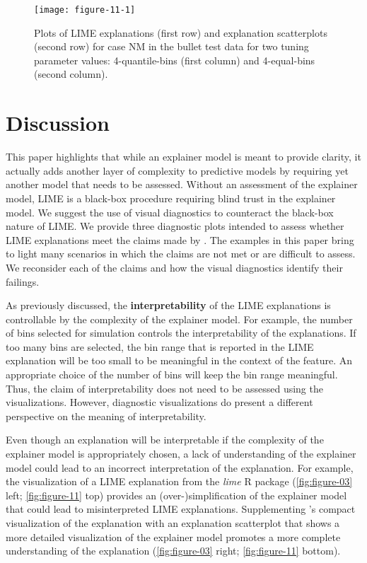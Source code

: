 \documentclass[AMS,STIX2COL]{WileyNJD-v2}\usepackage[]{graphicx}\usepackage[]{color}
\newenvironment{knitrout}{}{} %
\begin{document}
\begin{figure}[!thp]
\begin{knitrout}
\color{fgcolor}

{\centering \texttt{[image: figure-11-1]} 

}



\end{knitrout}
\caption{Plots of LIME explanations (first row) and explanation scatterplots (second row) for case NM in the bullet test data for two tuning parameter values: 4-quantile-bins (first column) and 4-equal-bins (second column).}
\label{fig:figure-11}
\end{figure}

\section{Discussion} \label{discussion}

This paper highlights that while an explainer model is meant to provide clarity, it actually adds another layer of complexity to predictive models by requiring yet another model that needs to be assessed. Without an assessment of the explainer model, LIME is a black-box procedure requiring blind trust in the explainer model. We suggest the use of visual diagnostics to counteract the black-box nature of LIME. We provide three diagnostic plots intended to assess whether LIME explanations meet the claims made by \citet{ribeiro:2016}. The examples in this paper bring to light many scenarios in which the claims are not met or are difficult to assess. We reconsider each of the claims and how the visual diagnostics identify their failings.

As previously discussed, the \textbf{interpretability} of the LIME explanations is controllable by the complexity of the explainer model. For example, the number of bins selected for simulation controls the interpretability of the explanations. If too many bins are selected, the bin range that is reported in the LIME explanation will be too small to be meaningful in the context of the feature. An appropriate choice of the number of bins will keep the bin range meaningful. Thus, the claim of interpretability does not need to be assessed using the visualizations. However, diagnostic visualizations do present a different perspective on the meaning of interpretability.

Even though an explanation will be interpretable if  the complexity of the explainer model is appropriately chosen, a lack of understanding of the explainer model could lead to an incorrect interpretation of the explanation. For example, the visualization of a LIME explanation from the \emph{lime} R package \citep{pedersen:2020} (\autoref{fig:figure-03} left; \autoref{fig:figure-11} top) provides an (over-)simplification of the explainer model that could lead to misinterpreted LIME explanations. Supplementing \citet{pedersen:2020}'s compact visualization of the explanation with an explanation scatterplot that shows a more detailed visualization of the explainer model promotes a more complete understanding of the explanation (\autoref{fig:figure-03} right; \autoref{fig:figure-11} bottom).
\end{document}
